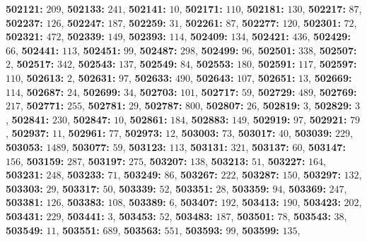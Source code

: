 \textsf{\bfseries 502121:} $209$, \textsf{\bfseries 502133:} $241$, \textsf{\bfseries 502141:} $10$, \textsf{\bfseries 502171:} $110$, \textsf{\bfseries 502181:} $130$, \textsf{\bfseries 502217:} $87$, \textsf{\bfseries 502237:} $126$, \textsf{\bfseries 502247:} $187$, \textsf{\bfseries 502259:} $31$, \textsf{\bfseries 502261:} $87$, \textsf{\bfseries 502277:} $120$, \textsf{\bfseries 502301:} $72$, \textsf{\bfseries 502321:} $472$, \textsf{\bfseries 502339:} $149$, \textsf{\bfseries 502393:} $114$, \textsf{\bfseries 502409:} $134$, \textsf{\bfseries 502421:} $436$, \textsf{\bfseries 502429:} $66$, \textsf{\bfseries 502441:} $113$, \textsf{\bfseries 502451:} $99$, \textsf{\bfseries 502487:} $298$, \textsf{\bfseries 502499:} $96$, \textsf{\bfseries 502501:} $338$, \textsf{\bfseries 502507:} $2$, \textsf{\bfseries 502517:} $342$, \textsf{\bfseries 502543:} $137$, \textsf{\bfseries 502549:} $84$, \textsf{\bfseries 502553:} $180$, \textsf{\bfseries 502591:} $117$, \textsf{\bfseries 502597:} $110$, \textsf{\bfseries 502613:} $2$, \textsf{\bfseries 502631:} $97$, \textsf{\bfseries 502633:} $490$, \textsf{\bfseries 502643:} $107$, \textsf{\bfseries 502651:} $13$, \textsf{\bfseries 502669:} $114$, \textsf{\bfseries 502687:} $24$, \textsf{\bfseries 502699:} $34$, \textsf{\bfseries 502703:} $101$, \textsf{\bfseries 502717:} $59$, \textsf{\bfseries 502729:} $489$, \textsf{\bfseries 502769:} $217$, \textsf{\bfseries 502771:} $255$, \textsf{\bfseries 502781:} $29$, \textsf{\bfseries 502787:} $800$, \textsf{\bfseries 502807:} $26$, \textsf{\bfseries 502819:} $3$, \textsf{\bfseries 502829:} $3$, \textsf{\bfseries 502841:} $230$, \textsf{\bfseries 502847:} $10$, \textsf{\bfseries 502861:} $184$, \textsf{\bfseries 502883:} $149$, \textsf{\bfseries 502919:} $97$, \textsf{\bfseries 502921:} $79$, \textsf{\bfseries 502937:} $11$, \textsf{\bfseries 502961:} $77$, \textsf{\bfseries 502973:} $12$, \textsf{\bfseries 503003:} $73$, \textsf{\bfseries 503017:} $40$, \textsf{\bfseries 503039:} $229$, \textsf{\bfseries 503053:} $1489$, \textsf{\bfseries 503077:} $59$, \textsf{\bfseries 503123:} $113$, \textsf{\bfseries 503131:} $321$, \textsf{\bfseries 503137:} $60$, \textsf{\bfseries 503147:} $156$, \textsf{\bfseries 503159:} $287$, \textsf{\bfseries 503197:} $275$, \textsf{\bfseries 503207:} $138$, \textsf{\bfseries 503213:} $51$, \textsf{\bfseries 503227:} $164$, \textsf{\bfseries 503231:} $248$, \textsf{\bfseries 503233:} $71$, \textsf{\bfseries 503249:} $86$, \textsf{\bfseries 503267:} $222$, \textsf{\bfseries 503287:} $150$, \textsf{\bfseries 503297:} $132$, \textsf{\bfseries 503303:} $29$, \textsf{\bfseries 503317:} $50$, \textsf{\bfseries 503339:} $52$, \textsf{\bfseries 503351:} $28$, \textsf{\bfseries 503359:} $94$, \textsf{\bfseries 503369:} $247$, \textsf{\bfseries 503381:} $126$, \textsf{\bfseries 503383:} $108$, \textsf{\bfseries 503389:} $6$, \textsf{\bfseries 503407:} $192$, \textsf{\bfseries 503413:} $190$, \textsf{\bfseries 503423:} $202$, \textsf{\bfseries 503431:} $229$, \textsf{\bfseries 503441:} $3$, \textsf{\bfseries 503453:} $52$, \textsf{\bfseries 503483:} $187$, \textsf{\bfseries 503501:} $78$, \textsf{\bfseries 503543:} $38$, \textsf{\bfseries 503549:} $11$, \textsf{\bfseries 503551:} $689$, \textsf{\bfseries 503563:} $551$, \textsf{\bfseries 503593:} $99$, \textsf{\bfseries 503599:} $135$, 

